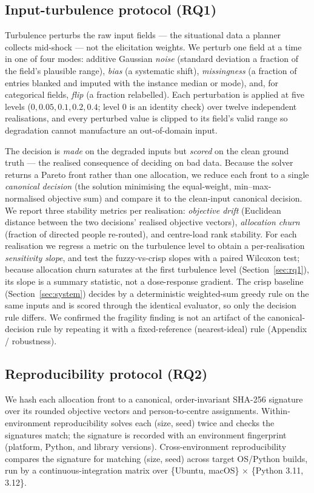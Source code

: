 \documentclass[systems,article,submit,moreauthors,pdftex]{Definitions/mdpi}
\begin{document}
\subsection{Input-turbulence protocol (RQ1)}\label{sec:method-turbulence}
Turbulence perturbs the raw input fields --- the situational data a planner collects
mid-shock --- not the elicitation weights. We perturb one field at a time in one of four
modes: additive Gaussian \emph{noise} (standard deviation a fraction of the field's plausible
range), \emph{bias} (a systematic shift), \emph{missingness} (a fraction of entries blanked
and imputed with the instance median or mode), and, for categorical fields, \emph{flip} (a
fraction relabelled). Each perturbation is applied at five levels ($0, 0.05, 0.1, 0.2, 0.4$;
level $0$ is an identity check) over twelve independent realisations, and every perturbed
value is clipped to its field's valid range so degradation cannot manufacture an
out-of-domain input.

The decision is \emph{made} on the degraded inputs but \emph{scored} on the clean ground
truth --- the realised consequence of deciding on bad data. Because the solver returns a
Pareto front rather than one allocation, we reduce each front to a single \emph{canonical
decision} (the solution minimising the equal-weight, min--max-normalised objective sum) and
compare it to the clean-input canonical decision. We report three stability metrics per
realisation: \emph{objective drift} (Euclidean distance between the two decisions' realised
objective vectors), \emph{allocation churn} (fraction of directed people re-routed), and
centre-load rank stability. For each realisation we regress a metric on the turbulence level
to obtain a per-realisation \emph{sensitivity slope}, and test the fuzzy-vs-crisp slopes with a
paired Wilcoxon test; because allocation churn saturates at the first turbulence level
(Section~\ref{sec:rq1}), its slope is a summary statistic, not a dose-response gradient. The crisp baseline (Section~\ref{sec:system}) decides by a deterministic
weighted-sum greedy rule on the same inputs and is scored through the identical evaluator, so
only the decision rule differs. We confirmed the fragility finding is not an artifact of the
canonical-decision rule by repeating it with a fixed-reference (nearest-ideal) rule
(Appendix / robustness).

\subsection{Reproducibility protocol (RQ2)}\label{sec:method-repro}
We hash each allocation front to a canonical, order-invariant SHA-256 signature over its
rounded objective vectors and person-to-centre assignments. Within-environment
reproducibility solves each (size, seed) twice and checks the signatures match; the signature
is recorded with an environment fingerprint (platform, Python, and library versions).
Cross-environment reproducibility compares the signature for matching (size, seed) across
target OS/Python builds, run by a continuous-integration matrix over \{Ubuntu, macOS\}
$\times$ \{Python 3.11, 3.12\}.
\end{document}
